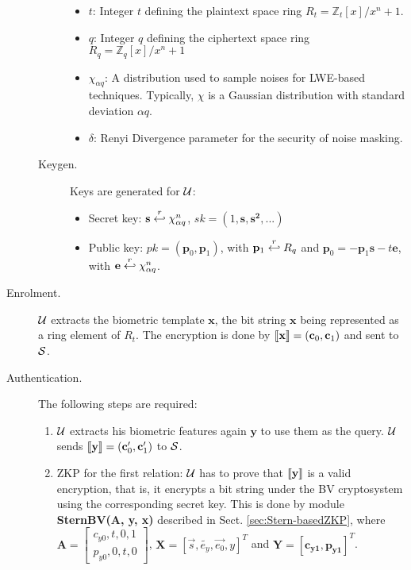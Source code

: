 \begin{description}
\begin{description}
\begin{itemize}
    \item $t$: Integer $t$ defining the plaintext space ring $R_t = \mathbb{Z}_t[x]/x^n+1$.
    \item $q$: Integer $q$ defining the ciphertext space ring $R_q = \mathbb{Z}_q[x]/x^n+1$
    \item $\chi_{\alpha q}$: A distribution used to sample noises for LWE-based techniques.  Typically, $\chi$
      is a Gaussian distribution with standard deviation $\alpha q$.
    \item \(\delta\): Renyi Divergence parameter for the security of noise masking.
    \end{itemize}
  \item[Keygen.] Keys are generated for $\mathcal{U}$:
    \begin{itemize}
    \item Secret key: $\mathbf{s} \stackrel{r}{\hookleftarrow} \chi_{\alpha q}^n$, \(sk = (1, \mathbf{s, s^{2}, ...})\)
    \item Public key: $pk = (\mathbf{p}_0,\mathbf{p}_1)$, with $\mathbf{p}_1 \stackrel{r}{\hookleftarrow} R_q$ and
      $\mathbf{p}_0 = -\mathbf{p}_1\mathbf{s} - t\mathbf{e}$, with $\mathbf{e} \stackrel{r}{\hookleftarrow} \chi_{\alpha q}^n$.
    \end{itemize}
  \end{description}
\item [Enrolment.] $\mathcal{U}$ extracts the biometric template $\mathbf{x}$, the bit string $\mathbf{x}$ being
  represented as a ring element of ${R}_t$.  The encryption is done by $\left\llbracket\mathbf{x}\right\rrbracket = (\mathbf{c}_0,\mathbf{c}_1)$
  and sent to $\mathcal{S}$.
\item [Authentication.] The following steps are required:
  \begin{enumerate}
  \item $\mathcal{U}$ extracts his biometric features again $\mathbf{y}$ to use them as the query. $\mathcal{U}$ sends
    $\left\llbracket\mathbf{y}\right\rrbracket = (\mathbf{c}_0', \mathbf{c}_1')$ to $\mathcal{S}$.
  \item ZKP for the first relation: $\mathcal{U}$ has to prove that $\left\llbracket\mathbf{y}\right\rrbracket$ is a valid encryption, that is, it
    encrypts a bit string under the BV cryptosystem using the corresponding secret key. This is done by module
    \textbf{SternBV(A, y, x)} described in Sect. \ref{sec:Stern-basedZKP}, where
    $\mathbf{A} = \begin{bmatrix} c_{y0}, t, 0, 1\\p_{y0}, 0, t, 0
    \end{bmatrix}$, \(\mathbf{X} = [\vec{s},\tilde{e_{y}},\vec{e_{0}},y]^T\) and \(\mathbf{Y
    = [c_{y1},p_{y1}]}^{T}\).


\end{enumerate}
\end{description}
